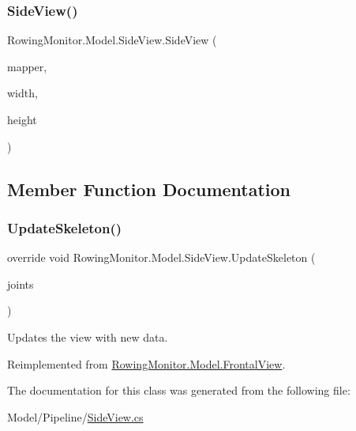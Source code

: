 \subsubsection{\texorpdfstring{Side\+View()}{SideView()}}
{\footnotesize\ttfamily Rowing\+Monitor.\+Model.\+Side\+View.\+Side\+View (\begin{DoxyParamCaption}\item[{Coordinate\+Mapper}]{mapper,  }\item[{int}]{width,  }\item[{int}]{height }\end{DoxyParamCaption})}



\subsection{Member Function Documentation}
\mbox{\label{class_rowing_monitor_1_1_model_1_1_side_view_a2cfba6b08a666c71ed25a3cbeaabe138}} 
\subsubsection{\texorpdfstring{Update\+Skeleton()}{UpdateSkeleton()}}
{\footnotesize\ttfamily override void Rowing\+Monitor.\+Model.\+Side\+View.\+Update\+Skeleton (\begin{DoxyParamCaption}\item[{I\+Read\+Only\+Dictionary$<$ Joint\+Type, Joint $>$}]{joints }\end{DoxyParamCaption})\hspace{0.3cm}{\ttfamily [virtual]}}



Updates the view with new data. 



Reimplemented from \hyperlink{class_rowing_monitor_1_1_model_1_1_frontal_view_a3dddfa75ba346fdcf99dbd763e9ea1ea}{Rowing\+Monitor.\+Model.\+Frontal\+View}.



The documentation for this class was generated from the following file\+:\begin{DoxyCompactItemize}
\item 
Model/\+Pipeline/\hyperlink{_side_view_8cs}{Side\+View.\+cs}\end{DoxyCompactItemize}
